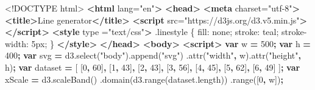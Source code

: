 \documentclass[openany]{book}
\newenvironment{Shaded}{\begin{snugshade}}{\end{snugshade}}
\newcommand{\AttributeTok}[1]{\textcolor[rgb]{0.77,0.63,0.00}{#1}}
\newcommand{\DataTypeTok}[1]{\textcolor[rgb]{0.13,0.29,0.53}{#1}}
\newcommand{\DecValTok}[1]{\textcolor[rgb]{0.00,0.00,0.81}{#1}}
\newcommand{\FunctionTok}[1]{\textcolor[rgb]{0.00,0.00,0.00}{#1}}
\newcommand{\KeywordTok}[1]{\textcolor[rgb]{0.13,0.29,0.53}{\textbf{#1}}}
\newcommand{\NormalTok}[1]{#1}
\newcommand{\OperatorTok}[1]{\textcolor[rgb]{0.81,0.36,0.00}{\textbf{#1}}}
\newcommand{\OtherTok}[1]{\textcolor[rgb]{0.56,0.35,0.01}{#1}}
\newcommand{\StringTok}[1]{\textcolor[rgb]{0.31,0.60,0.02}{#1}}
\newcommand{\VariableTok}[1]{\textcolor[rgb]{0.00,0.00,0.00}{#1}}
\begin{document}
\begin{Shaded}
\begin{Highlighting}[]
\DataTypeTok{<!DOCTYPE }\NormalTok{html}\DataTypeTok{>}
\KeywordTok{<html}\OtherTok{ lang=}\StringTok{"en"}\KeywordTok{>}
  \KeywordTok{<head>}
    \KeywordTok{<meta}\OtherTok{ charset=}\StringTok{"utf-8"}\KeywordTok{>}
    \KeywordTok{<title>}\NormalTok{Line generator}\KeywordTok{</title>}
    \KeywordTok{<script}\OtherTok{ src=}\StringTok{"https://d3js.org/d3.v5.min.js"}\KeywordTok{></script>}
    \KeywordTok{<style}\OtherTok{ type} \OtherTok{=}\StringTok{"text/css"}\KeywordTok{>}
      \FunctionTok{.linestyle}\NormalTok{ \{}
\NormalTok{        fill: }\DecValTok{none}\NormalTok{;}
\NormalTok{        stroke: }\DecValTok{teal}\NormalTok{;}
\NormalTok{        stroke-width: }\DecValTok{5px}\NormalTok{;}
\NormalTok{      \}}
    \KeywordTok{</style>}
  \KeywordTok{</head>}
  \KeywordTok{<body>}
    \KeywordTok{<script>}
      \KeywordTok{var}\NormalTok{ w }\OperatorTok{=} \DecValTok{500}\OperatorTok{;}
      \KeywordTok{var}\NormalTok{ h }\OperatorTok{=} \DecValTok{400}\OperatorTok{;}
      \KeywordTok{var}\NormalTok{ svg }\OperatorTok{=} \VariableTok{d3}\NormalTok{.}\AttributeTok{select}\NormalTok{(}\StringTok{"body"}\NormalTok{).}\AttributeTok{append}\NormalTok{(}\StringTok{"svg"}\NormalTok{)}
\NormalTok{          .}\AttributeTok{attr}\NormalTok{(}\StringTok{"width"}\OperatorTok{,}\NormalTok{ w).}\AttributeTok{attr}\NormalTok{(}\StringTok{"height"}\OperatorTok{,}\NormalTok{ h)}\OperatorTok{;}
      \KeywordTok{var}\NormalTok{ dataset }\OperatorTok{=}\NormalTok{ [ [}\DecValTok{0}\OperatorTok{,} \DecValTok{60}\NormalTok{]}\OperatorTok{,}\NormalTok{ [}\DecValTok{1}\OperatorTok{,} \DecValTok{43}\NormalTok{]}\OperatorTok{,}\NormalTok{ [}\DecValTok{2}\OperatorTok{,} \DecValTok{43}\NormalTok{]}\OperatorTok{,}\NormalTok{ [}\DecValTok{3}\OperatorTok{,} \DecValTok{56}\NormalTok{]}\OperatorTok{,}
\NormalTok{          [}\DecValTok{4}\OperatorTok{,} \DecValTok{45}\NormalTok{]}\OperatorTok{,}\NormalTok{ [}\DecValTok{5}\OperatorTok{,} \DecValTok{62}\NormalTok{]}\OperatorTok{,}\NormalTok{ [}\DecValTok{6}\OperatorTok{,} \DecValTok{49}\NormalTok{] ]}\OperatorTok{;}
      \KeywordTok{var}\NormalTok{ xScale }\OperatorTok{=} \VariableTok{d3}\NormalTok{.}\AttributeTok{scaleBand}\NormalTok{()}
\NormalTok{        .}\AttributeTok{domain}\NormalTok{(}\VariableTok{d3}\NormalTok{.}\AttributeTok{range}\NormalTok{(}\VariableTok{dataset}\NormalTok{.}\AttributeTok{length}\NormalTok{))}
\NormalTok{        .}\AttributeTok{range}\NormalTok{([}\DecValTok{0}\OperatorTok{,}\NormalTok{ w])}\OperatorTok{;}

\end{Highlighting}
\end{Shaded}
\end{document}

